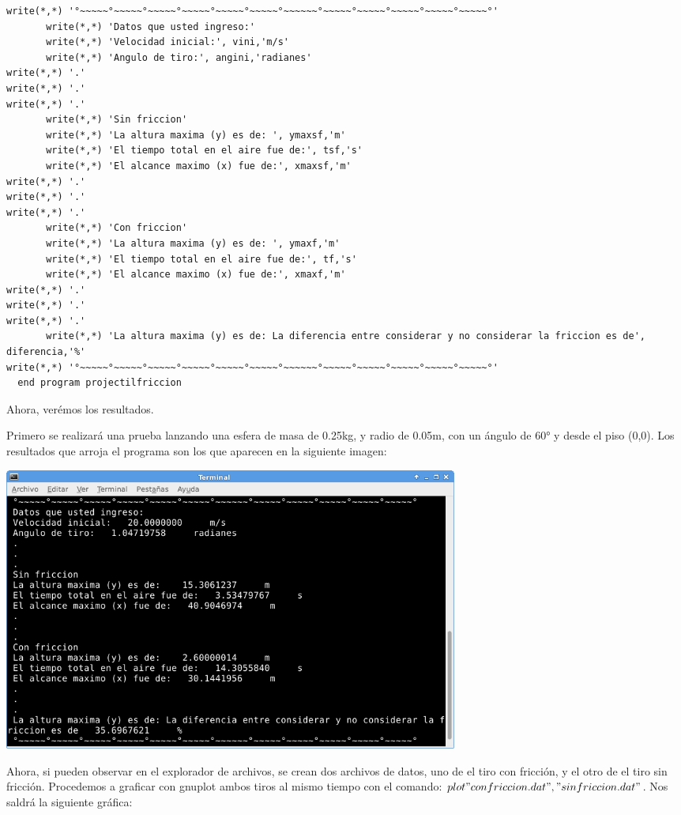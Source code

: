 \documentclass[12pt]{article}
\begin{document}
\begin{verbatim}
write(*,*) '°~~~~~°~~~~~°~~~~~°~~~~~°~~~~~°~~~~~°~~~~~~°~~~~~°~~~~~°~~~~~°~~~~~°~~~~~°'
       write(*,*) 'Datos que usted ingreso:'
       write(*,*) 'Velocidad inicial:', vini,'m/s'
       write(*,*) 'Angulo de tiro:', angini,'radianes'
write(*,*) '.'
write(*,*) '.'
write(*,*) '.'
       write(*,*) 'Sin friccion'
       write(*,*) 'La altura maxima (y) es de: ', ymaxsf,'m'
       write(*,*) 'El tiempo total en el aire fue de:', tsf,'s'
       write(*,*) 'El alcance maximo (x) fue de:', xmaxsf,'m'
write(*,*) '.'
write(*,*) '.'
write(*,*) '.'
       write(*,*) 'Con friccion'
       write(*,*) 'La altura maxima (y) es de: ', ymaxf,'m'
       write(*,*) 'El tiempo total en el aire fue de:', tf,'s'
       write(*,*) 'El alcance maximo (x) fue de:', xmaxf,'m'
write(*,*) '.'
write(*,*) '.'
write(*,*) '.'
       write(*,*) 'La altura maxima (y) es de: La diferencia entre considerar y no considerar la friccion es de', diferencia,'%'
write(*,*) '°~~~~~°~~~~~°~~~~~°~~~~~°~~~~~°~~~~~°~~~~~~°~~~~~°~~~~~°~~~~~°~~~~~°~~~~~°'
  end program projectilfriccion 

\end{verbatim}

Ahora, verémos los resultados.

Primero se realizará una prueba lanzando una esfera de masa de 0.25kg, y radio de 0.05m, con un ángulo de 60° y desde el piso (0,0).
Los resultados que arroja el programa son los que aparecen en la siguiente imagen:


\begin{center}
\includegraphics[width=15cm]{resul60.png}\\
\end{center}

Ahora, si pueden observar en el explorador de archivos, se crean dos archivos de datos, uno de el tiro con fricción, y el otro de el tiro sin fricción. Procedemos a graficar con gnuplot ambos tiros al mismo tiempo con el comando: $plot "confriccion.dat", "sinfriccion.dat"$. Nos saldrá la siguiente gráfica:
\end{document}
